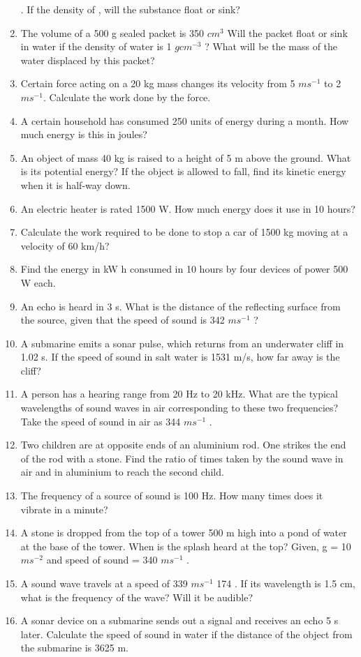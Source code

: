 \begin{enumerate}[label=\arabic*.,ref=\thesubsection.\theenumi]
. If the density of , will the substance float or sink? 
\item  The volume of a 500 g sealed packet is 350 $cm^3$
Will the packet float or sink in water if the density of water is 1 $g cm^{-3}$ ? What will be the mass of the water displaced by this packet?
\item Certain force acting on a 20 kg mass changes its velocity from 5 $m s^{-1}$
to 2 $m s^{-1}$. Calculate the work done by the force.
\item A certain household has consumed 250 units of energy during a month. How much energy is this in joules?
\item  An object of mass 40 kg is raised to a height of 5 m above the ground. What is its potential energy? If the object is allowed to fall, find its kinetic energy when it is half-way down.
\item An electric heater is rated 1500 W. How much energy does it use in 10 hours?
\item Calculate the work required to be done to stop a car of 1500 kg moving at a velocity of 60 km/h?
\item Find the energy in kW h consumed in 10 hours by four devices of power 500 W each.
\item An echo is heard in 3 s. What is the distance of the reflecting surface from the source, given that the speed of sound is 342 $m s^{-1}$
?  
\item A submarine emits a sonar pulse, which returns from an underwater cliff in 1.02 s. If the speed of sound in salt water is 1531 m/s, how far away is the cliff?
\item A person has a hearing range from 20 Hz to 20 kHz. What are the typical wavelengths of sound waves in air corresponding to these two frequencies? Take the speed of sound in air as 344 $m s^{-1}$
.
\item Two children are at opposite ends of an aluminium rod. One strikes the end of the rod with a stone. Find the ratio of times taken by the sound wave in air and in aluminium to reach the second child.
\item  The frequency of a source of sound is 100 Hz. How many times does it vibrate in a minute?
\item A stone is dropped from the top of a tower 500 m high into a pond of water at the base of the tower. When is the splash heard at the top? Given, g = 10 $m s^{-2}$
and speed of sound = 340 $m s^{-1}$ . 
\item  A sound wave travels at a speed of 339 $m s^{-1}$ 174 . If its
wavelength is 1.5 cm, what is the frequency of the wave? Will it be audible?
\item A sonar device on a submarine sends out a signal and receives an echo 5 s later. Calculate the speed of sound in water if the distance of the object from the submarine is 3625 m.
\end{enumerate}
%

